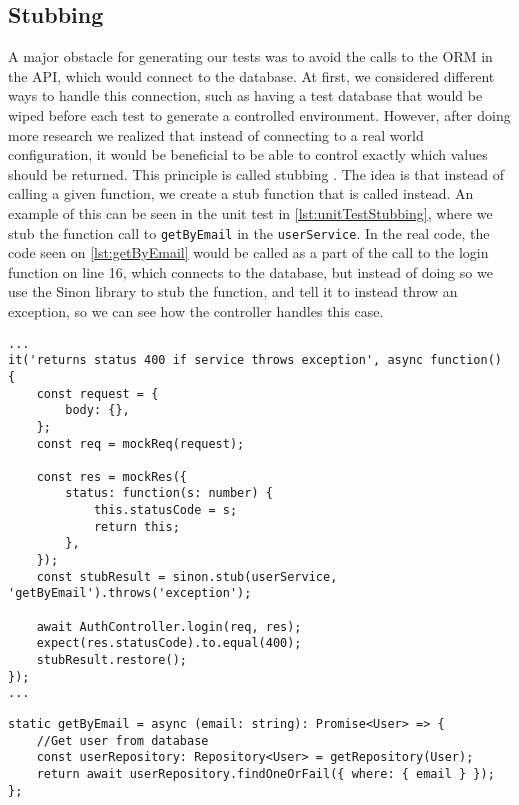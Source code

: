 \subsection{Stubbing}
A major obstacle for generating our tests was to avoid the calls to the ORM in the API, which would connect to the database.
At first, we considered different ways to handle this connection, such as having a test database that would be wiped before each test to generate a controlled environment.
However, after doing more research we realized that instead of connecting to a real world configuration, it would be beneficial to be able to control exactly which values should be returned.
This principle is called stubbing \cite{SoftwareTesting}.
The idea is that instead of calling a given function, we create a stub function that is called instead.
An example of this can be seen in the unit test in \autoref{lst:unitTestStubbing}, where we stub the function call to \texttt{getByEmail} in the \texttt{userService}.
In the real code, the code seen on \autoref{lst:getByEmail} would be called as a part of the call to the login function on line 16, which connects to the database, but instead of doing so we use the Sinon library to stub the function, and tell it to instead throw an exception, so we can see how the controller handles this case.

\begin{lstlisting}[caption={Unit test with stubbing},label={lst:unitTestStubbing}]
...
it('returns status 400 if service throws exception', async function() {
    const request = {
        body: {},
    };
    const req = mockReq(request);

    const res = mockRes({
        status: function(s: number) {
            this.statusCode = s;
            return this;
        },
    });
    const stubResult = sinon.stub(userService, 'getByEmail').throws('exception');

    await AuthController.login(req, res);
    expect(res.statusCode).to.equal(400);
    stubResult.restore();
});
...
\end{lstlisting}

\begin{lstlisting}[caption={Actual getByEmail function},label={lst:getByEmail}]
static getByEmail = async (email: string): Promise<User> => {
    //Get user from database
    const userRepository: Repository<User> = getRepository(User);
    return await userRepository.findOneOrFail({ where: { email } });
};
\end{lstlisting}

